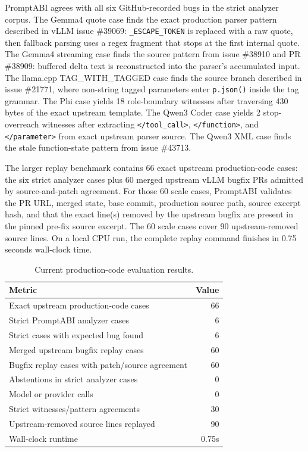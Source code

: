 \documentclass[10pt]{article}
\begin{document}
PromptABI agrees with all six GitHub-recorded bugs in the strict analyzer
corpus. The Gemma4
quote case finds the exact production parser pattern described in vLLM issue
\#39069: \texttt{\_ESCAPE\_TOKEN} is replaced with a raw quote, then fallback
parsing uses a regex fragment that stops at the first internal quote. The Gemma4
streaming case finds the source pattern from issue \#38910 and PR \#38909:
buffered delta text is reconstructed into the parser's accumulated input. The
llama.cpp TAG\_WITH\_TAGGED case finds the source branch described in issue
\#21771, where non-string tagged parameters enter \texttt{p.json()} inside the
tag grammar. The Phi case yields 18 role-boundary witnesses after traversing 430
bytes of the exact upstream template. The Qwen3 Coder case yields 2
stop-overreach witnesses after extracting \texttt{</tool\_call>},
\texttt{</function>}, and \texttt{</parameter>} from exact upstream parser
source. The Qwen3 XML case finds the stale function-state pattern from issue
\#43713.

The larger replay benchmark contains 66 exact upstream production-code cases:
the six strict analyzer cases plus 60 merged upstream vLLM bugfix PRs admitted
by source-and-patch agreement. For those 60 scale cases, PromptABI validates the
PR URL, merged state, base commit, production source path, source excerpt hash,
and that the exact line(s) removed by the upstream bugfix are present in the
pinned pre-fix source excerpt. The 60 scale cases cover 90 upstream-removed
source lines. On a local CPU run, the complete replay command finishes in 0.75
seconds wall-clock time.

\begin{table}[h]
\centering
\small
\begin{tabular}{lr}
\toprule
Metric & Value \\
\midrule
Exact upstream production-code cases & 66 \\
Strict PromptABI analyzer cases & 6 \\
Strict cases with expected bug found & 6 \\
Merged upstream bugfix replay cases & 60 \\
Bugfix replay cases with patch/source agreement & 60 \\
Abstentions in strict analyzer cases & 0 \\
Model or provider calls & 0 \\
Strict witnesses/pattern agreements & 30 \\
Upstream-removed source lines replayed & 90 \\
Wall-clock runtime & 0.75s \\
\bottomrule
\end{tabular}
\caption{Current production-code evaluation results.}
\label{tab:results}
\end{table}
\end{document}
